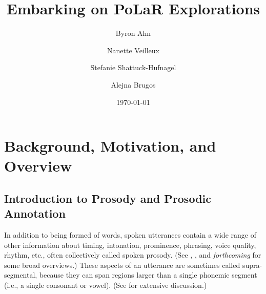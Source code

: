 \documentclass[11pt, twoside]{memoir}
\def\THIStitle{Embarking on PoLaR Explorations}
\def\THISsubtitle{A Framework for Intonational Annotation and Analysis}
\begin{document}
\frontmatter
{}

\title{\THIStitle}
\author{Byron Ahn \and Nanette Veilleux \and Stefanie Shattuck-Hufnagel \and Alejna Brugos}
\date{\today}


\tableofcontents
\newpage
\listoffigures
\listoftables
\newpage

\mainmatter


\chapter{Background, Motivation, and Overview}\label{ch:background}

\section{Introduction to Prosody and Prosodic Annotation}\label{sec:introduction-to-prosody-and-prosodic-annotation}

In addition to being formed of words, spoken utterances contain a wide range of other information about timing, intonation, prominence, phrasing, voice quality, rhythm, etc., often collectively called spoken prosody. (See \citealt{ladd08}, \citealt{beckmanvenditti11}, and \citeauthor{barnesshattuckhufnagel20} \textit{forthcoming} for some broad overviews.) These aspects of an utterance are sometimes called supra-segmental, because they can span regions larger than a single phonemic segment (i.e., a single consonant or vowel). (See \citealt{lehiste70} for extensive discussion.)
\end{document}
